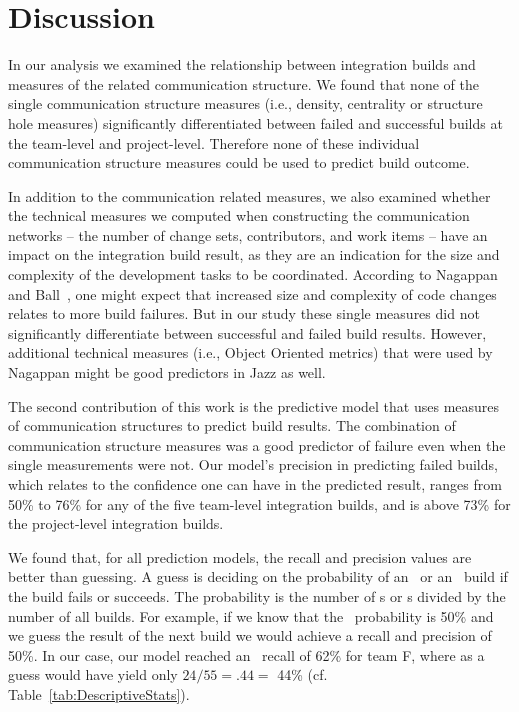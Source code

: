 \section{Discussion}
\label{sec:discussion5}
In our analysis we examined the relationship between integration builds and
measures of the related communication structure. We found that none of the single
communication structure measures (i.e., density, centrality or structure hole measures)
significantly differentiated between failed and successful builds at the
team-level and project-level. Therefore none of these individual communication
structure measures could be used to predict build outcome.

In addition to the communication related measures, we also examined whether the
technical measures we computed when constructing the communication networks --
the number of change sets, contributors, and work items -- have an impact on the
integration build result, as they are an indication for the size and complexity
of the development tasks to be coordinated. According to Nagappan and
Ball~\cite{nagappan:icse:2005}, one might expect that increased size and complexity
of code changes relates to more build failures. But in our study these single
measures did not significantly differentiate between successful and failed build
results. However, additional technical measures (i.e., Object Oriented metrics) that were used by Nagappan might be good predictors in Jazz as well.

The second contribution of this work is the predictive model that uses measures
of communication structures to predict build results. The
combination of communication structure measures was a good predictor of failure
even when the single measurements were not. Our model's precision in predicting
failed builds, which relates to the confidence one can have in the predicted
result, ranges from 50\% to 76\% for any of the five team-level integration
builds, and is above 73\% for the project-level integration builds.

We found that, for all prediction models, the recall and precision values are
better than guessing. A guess is deciding on the probability of an \error\ or an
\ok\ build if the build fails or succeeds. The probability is the number of
\error s or \ok s divided by the number of all builds. For example, if we know
that the \error\ probability is 50\% and we guess the result of the next build we
would achieve a recall and precision of 50\%. In our case, our model reached an
\error\ recall of 62\% for team F, where as a guess would have yield only
$24/55=.44=$ 44\% (cf. Table~\ref{tab:DescriptiveStats}).

